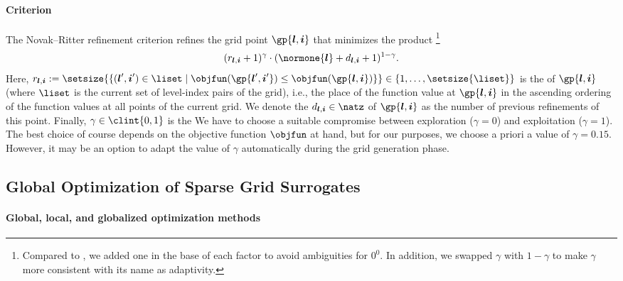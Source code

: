 
\paragraph{Criterion}

The Novak--Ritter refinement criterion \cite{Novak96Global}
refines the grid point $\gp{\*l,\*i}$ that minimizes the product%
\footnote{%
  Compared to \cite{Novak96Global},
  we added one in the base of each factor to avoid ambiguities
  for $0^0$.
  In addition, we swapped $\gamma$ with $1-\gamma$
  to make $\gamma$ more consistent with its name as adaptivity.%
}
\begin{equation}
  (r_{\*l,\*i} + 1)^\gamma \cdot
  (\normone{\*l} + d_{\*l,\*i} + 1)^{1 - \gamma}.
\end{equation}
Here, $r_{\*l,\*i} := \setsize{
  \{(\*l',\*i') \in \liset \mid
  \objfun(\gp{\*l',\*i'}) \le \objfun(\gp{\*l,\*i})\}
} \in \{1, \dotsc, \setsize{\liset}\}$ is the  of $\gp{\*l,\*i}$
(where $\liset$ is the current set of level-index pairs of the grid), i.e.,
the place of the function value at $\gp{\*l,\*i}$
in the ascending ordering of the function values at all points
of the current grid.
We denote the  $d_{\*l,\*i} \in \natz$ of $\gp{\*l,\*i}$
as the number of previous refinements of this point.
Finally, $\gamma \in \clint{0, 1}$ is the 
We have to choose a suitable compromise between exploration ($\gamma = 0$)
and exploitation ($\gamma = 1$).
The best choice of course depends on the objective function $\objfun$ at hand,
but for our purposes, we choose a priori a value of $\gamma = 0.15$.
However, it may be an option to adapt the value of $\gamma$ automatically
during the grid generation phase.



\subsection{Global Optimization of Sparse Grid Surrogates}
\label{sec:522method}

\paragraph{Global, local, and globalized optimization methods}


